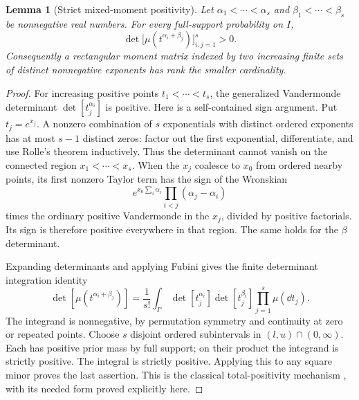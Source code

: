 \documentclass[11pt]{amsart}
\newtheorem{lemma}[theorem]{Lemma}
\theoremstyle{definition}\newtheorem{definition}[theorem]{Definition}
\theoremstyle{remark}\newtheorem{remark}[theorem]{Remark}
\begin{document}
\begin{lemma}[Strict mixed-moment positivity]\label{lem:mixed-moment}
Let $\alpha_1<\cdots<\alpha_s$ and $\beta_1<\cdots<\beta_s$ be
nonnegative real numbers. For every full-support probability on $I$,
\begin{equation}\label{eq:mixed-minor}
 \det\bigl[\mu(t^{\alpha_i+\beta_j})\bigr]_{i,j=1}^s>0.
\end{equation}
Consequently a rectangular moment matrix indexed by two increasing finite
sets of distinct nonnegative exponents has rank the smaller cardinality.
\end{lemma}
\begin{proof}
For increasing positive points $t_1<\cdots<t_s$, the generalized
Vandermonde determinant $\det[t_j^{\alpha_i}]$ is positive. Here is a
self-contained sign argument. Put $t_j=e^{x_j}$. A nonzero combination
of $s$ exponentials with distinct ordered exponents has at most $s-1$
distinct zeros: factor out the first exponential, differentiate, and use
Rolle's theorem inductively. Thus the determinant cannot vanish on the
connected region $x_1<\cdots<x_s$. When the $x_j$ coalesce to $x_0$
from ordered nearby points, its first nonzero Taylor term has the sign
of the Wronskian
\[
 e^{x_0\sum_i\alpha_i}\prod_{i<j}(\alpha_j-\alpha_i)
\]
times the ordinary positive Vandermonde in the $x_j$, divided by
positive factorials. Its sign is therefore positive everywhere in that
region. The same holds for the $\beta$ determinant.

Expanding determinants and applying Fubini gives the finite determinant
integration identity
\[
 \det[\mu(t^{\alpha_i+\beta_j})]
 =\frac1{s!}\int_{I^s}
       \det[t_j^{\alpha_i}]\det[t_j^{\beta_i}]
       \prod_{j=1}^s\mu(\dd t_j).
\]
The integrand is nonnegative, by permutation symmetry and continuity at
zero or repeated points. Choose $s$ disjoint ordered subintervals in
$(l,u)\cap(0,\infty)$. Each has positive prior mass by full support;
on their product the integrand is strictly positive. The integral is
strictly positive. Applying this to any square minor proves the last
assertion. This is the classical total-positivity mechanism
\cite{Pinkus}, with its needed form proved explicitly here.
\end{proof}
\end{document}
